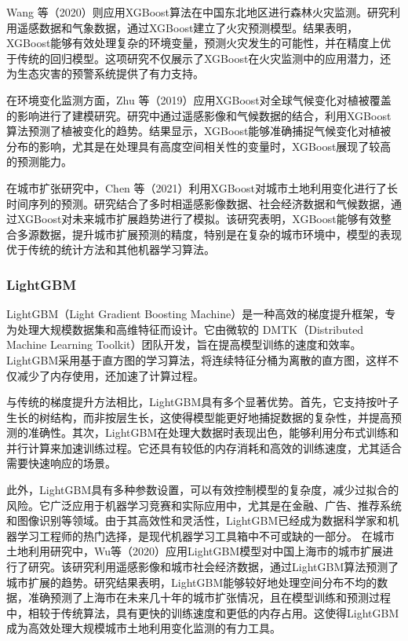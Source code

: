 \documentclass{article}
\begin{document}
		Wang 等（2020）则应用XGBoost算法在中国东北地区进行森林火灾监测\cite{wang2020}。研究利用遥感数据和气象数据，通过XGBoost建立了火灾预测模型。结果表明，XGBoost能够有效处理复杂的环境变量，预测火灾发生的可能性，并在精度上优于传统的回归模型。这项研究不仅展示了XGBoost在火灾监测中的应用潜力，还为生态灾害的预警系统提供了有力支持。
		
		在环境变化监测方面，Zhu 等（2019）应用XGBoost对全球气候变化对植被覆盖的影响进行了建模研究\cite{zhu2019}。研究中通过遥感影像和气候数据的结合，利用XGBoost算法预测了植被变化的趋势。结果显示，XGBoost能够准确捕捉气候变化对植被分布的影响，尤其是在处理具有高度空间相关性的变量时，XGBoost展现了较高的预测能力。
		
		在城市扩张研究中，Chen 等（2021）利用XGBoost对城市土地利用变化进行了长时间序列的预测\cite{chen2021}。研究结合了多时相遥感影像数据、社会经济数据和气候数据，通过XGBoost对未来城市扩展趋势进行了模拟。该研究表明，XGBoost能够有效整合多源数据，提升城市扩展预测的精度，特别是在复杂的城市环境中，模型的表现优于传统的统计方法和其他机器学习算法。
		
	
	\subsubsection{LightGBM}
	LightGBM（Light Gradient Boosting Machine）是一种高效的梯度提升框架，专为处理大规模数据集和高维特征而设计。它由微软的 DMTK（Distributed Machine Learning Toolkit）团队开发，旨在提高模型训练的速度和效率。LightGBM采用基于直方图的学习算法，将连续特征分桶为离散的直方图，这样不仅减少了内存使用，还加速了计算过程。
	
	与传统的梯度提升方法相比，LightGBM具有多个显著优势。首先，它支持按叶子生长的树结构，而非按层生长，这使得模型能更好地捕捉数据的复杂性，并提高预测的准确性。其次，LightGBM在处理大数据时表现出色，能够利用分布式训练和并行计算来加速训练过程。它还具有较低的内存消耗和高效的训练速度，尤其适合需要快速响应的场景。
	
	此外，LightGBM具有多种参数设置，可以有效控制模型的复杂度，减少过拟合的风险。它广泛应用于机器学习竞赛和实际应用中，尤其是在金融、广告、推荐系统和图像识别等领域。由于其高效性和灵活性，LightGBM已经成为数据科学家和机器学习工程师的热门选择，是现代机器学习工具箱中不可或缺的一部分。
	在城市土地利用研究中，Wu等（2020）应用LightGBM模型对中国上海市的城市扩展进行了研究\cite{wu2020}。该研究利用遥感影像和城市社会经济数据，通过LightGBM算法预测了城市扩展的趋势。研究结果表明，LightGBM能够较好地处理空间分布不均的数据，准确预测了上海市在未来几十年的城市扩张情况，且在模型训练和预测过程中，相较于传统算法，具有更快的训练速度和更低的内存占用。这使得LightGBM成为高效处理大规模城市土地利用变化监测的有力工具。
	
\end{document}
